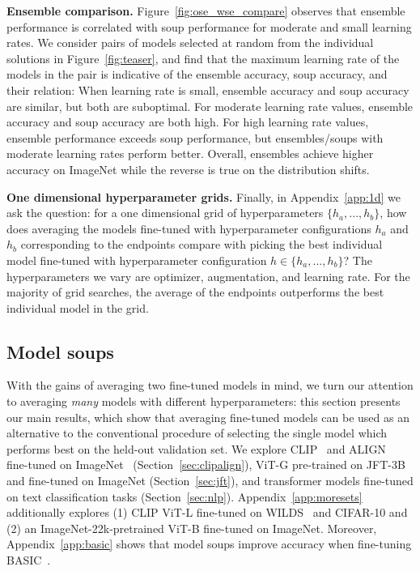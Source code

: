 \documentclass[nohyperref]{article}
\theoremstyle{plain}
\theoremstyle{definition}
\theoremstyle{remark}
\begin{document}
        \textbf{Ensemble comparison.} Figure~\ref{fig:ose_wse_compare} observes that ensemble performance is
        correlated with soup performance for moderate and small learning rates. We consider pairs of models selected at random from the individual solutions in Figure~\ref{fig:teaser}, and find that the maximum learning rate of the models in the pair is indicative of the ensemble accuracy, soup accuracy, and their relation:
        When learning rate is small, ensemble accuracy and soup accuracy are similar, but both are suboptimal.
        For moderate learning rate values, ensemble accuracy and soup accuracy are both high.
        For high learning rate values, ensemble performance exceeds soup performance, but ensembles/soups with
        moderate learning rates perform better.
        Overall, ensembles achieve higher accuracy on ImageNet while the reverse is true on the distribution shifts.
        
        \textbf{One dimensional hyperparameter grids.} 
        Finally, in Appendix~\ref{app:1d} we ask the question: for a one dimensional grid of hyperparameters $\{h_a,...,h_b\}$,
        how does averaging the models fine-tuned with
        hyperparameter configurations $h_a$ and $h_b$ corresponding to the endpoints compare with
        picking the best individual model fine-tuned with hyperparameter
        configuration $h \in \{h_a,...,h_b\}$?
        The hyperparameters we vary are optimizer,
        augmentation, and learning rate.
        For the majority of grid searches, the average of the endpoints outperforms
        the best individual model in the grid.
        
        \subsection{Model soups}\label{sec:mainres}
        
        With the gains of averaging two fine-tuned models in mind, we turn our attention to averaging \emph{many} models with different hyperparameters:  
        this section presents our main results, which show that averaging fine-tuned models can be used
        as an alternative to the conventional procedure of selecting the single
        model which performs best on the held-out validation set.
        We explore CLIP~\cite{radford2021learning} and ALIGN~\cite{jia2021scaling} fine-tuned on ImageNet~\cite{deng2009imagenet} (Section~\ref{sec:clipalign}), 
        ViT-G pre-trained on JFT-3B~\cite{zhai2021scaling} and fine-tuned on ImageNet (Section~\ref{sec:jft}), and transformer models fine-tuned on
        text classification tasks (Section~\ref{sec:nlp}).
        Appendix~\ref{app:moresets} additionally explores (1) CLIP ViT-L fine-tuned on WILDS~\cite{wilds2021} and CIFAR-10 and (2) an ImageNet-22k-pretrained ViT-B fine-tuned on ImageNet. %
        Moreover, Appendix~\ref{app:basic} shows that model soups improve accuracy when fine-tuning BASIC~\cite{pham2021scaling}.
    
\end{document}
